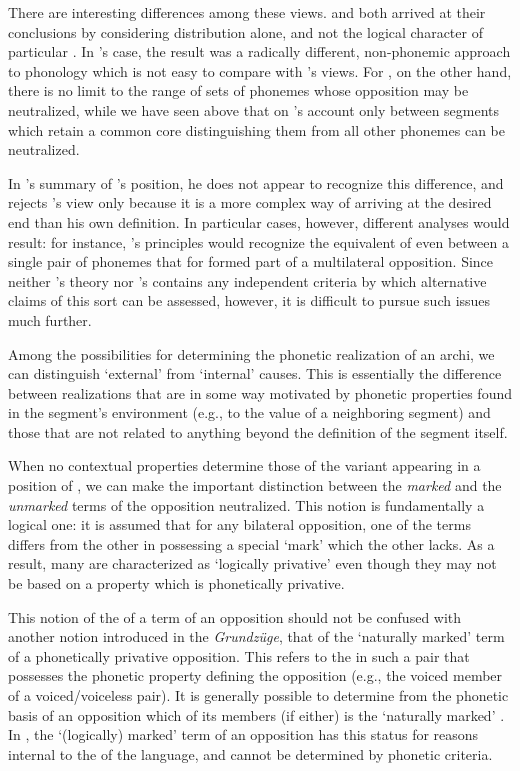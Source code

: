There are interesting differences among these views. {\Firth} and
{\Twaddell} both arrived at their conclusions by considering distribution
alone, and not the logical character of particular .  In
{\Firth}'s case, the result was a radically different, non-phonemic
approach to phonology which is not easy to compare with {\Trubetzkoy}'s
views. For {\Twaddell}, on the other hand, there is no limit to the range
of sets of phonemes whose opposition may be neutralized, while we have
seen above that on {\Trubetzkoy}'s account only  between
segments which retain a common core distinguishing them from all other
phonemes can be neutralized.

In {\Trubetzkoy}'s summary of {\Twaddell}'s position, he does not appear to
recognize this difference, and rejects {\Twaddell}'s view only because it
is a more complex way of arriving at the desired end than his own
definition. In particular cases, however, different analyses would
result: for instance, {\Twaddell}'s principles would recognize the
equivalent of  even between a single pair of phonemes
that for {\Trubetzkoy} formed part of a multilateral opposition. Since
neither {\Trubetzkoy}'s theory nor {\Twaddell}'s contains any independent
criteria by which alternative claims of this sort can be assessed,
however, it is difficult to pursue such issues much further.

Among the possibilities for determining the phonetic realization of an
archi\-, we can distinguish `external' from `internal'
causes. This is essentially the difference between realizations that
are in some way motivated by phonetic properties found in the
segment's environment (e.g.,  to the value of a
neighboring segment) and those that are not related to anything beyond
the definition of the segment itself.

When no contextual properties determine those of the variant appearing
in a position of , we can make the important distinction
between the \emph{marked} and the \emph{unmarked} terms of the
opposition neutralized. This notion is fundamentally a logical one: it
is assumed that for any bilateral opposition, one of the terms differs
from the other in possessing a special `mark' which the other
lacks. As a result, many  are characterized as `logically
privative' even though they may not be based on a property which is
phonetically privative.

This notion of the  of a term of an opposition should not be
confused with another notion introduced in the \textsl{Grundzüge}, that
of the `naturally marked' term of a phonetically privative
opposition. This refers to the  in such a pair that possesses
the phonetic property defining the opposition (e.g., the voiced member
of a voiced/voiceless pair). It is generally possible to determine
from the phonetic basis of an opposition which of its members (if
either) is the `naturally marked' . In , the
`(logically) marked' term of an opposition has this status for reasons
internal to the  of the language, and cannot be
determined by phonetic criteria.

